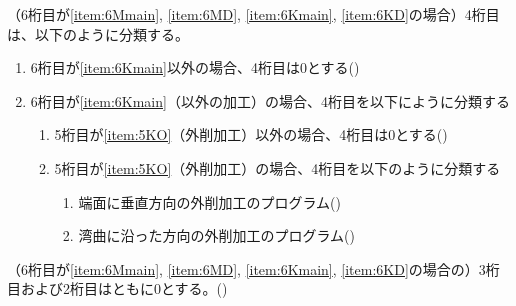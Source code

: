 （6桁目が\ref{item:6Mmain}, \ref{item:6MD}, \ref{item:6Kmain}, \ref{item:6KD}の場合）4桁目は、以下のように分類する。
\begin{enumerate}[label=\alph*), ref=\alph*)]
\item 6桁目が\ref{item:6Kmain}\hx 以外の場合、4桁目は0とする({})
\item 6桁目が\ref{item:6Kmain}（\Dimple 以外の加工）の場合、4桁目を以下にように分類する
  \begin{enumerate}[label=\alph{enumi}\,-\arabic*), leftmargin=\leftmargini]
  \item 5桁目が\ref{item:5KO}（外削加工）以外の場合、4桁目は0とする({})
  \item 5桁目が\ref{item:5KO}（外削加工）の場合、4桁目を以下のように分類する
    \begin{enumerate}[label=\arabic*., ref=\arabic*, start=0, leftmargin=*]
    \item 端面に垂直方向の外削加工のプログラム({})
    \item 湾曲に沿った方向の外削加工のプログラム({})
    \end{enumerate}
  \end{enumerate}
\end{enumerate}



（6桁目が\ref{item:6Mmain}, \ref{item:6MD}, \ref{item:6Kmain}, \ref{item:6KD}\hx の場合の）3桁目および2桁目はともに0とする。({})


